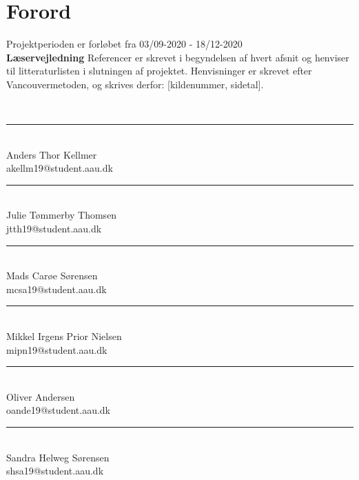 \section*{Forord}


Projektperioden er forløbet fra 03/09-2020 - 18/12-2020\\

\large\textbf{Læservejledning} \normalsize \newline
Referencer er skrevet i begyndelsen af hvert afsnit og henviser til litteraturlisten i slutningen af projektet. Henvisninger er skrevet efter Vancouvermetoden, og skrives derfor: [kildenummer, sidetal].
\bigskip

\textcolor{white}{tekst}

\begin{minipage}[L]{0.45\textwidth}
 \centering
 \rule{\textwidth}{0.5pt}\\
  Anders Thor Kellmer\\
 {\footnotesize akellm19@student.aau.dk}
\end{minipage}
\hfill
\begin{minipage}[H]{0.45\textwidth}
 \centering
 \rule{\textwidth}{0.5pt}\\
  Julie Tømmerby Thomsen\\
 {\footnotesize jtth19@student.aau.dk}
\end{minipage}
\vspace{3\baselineskip}


\begin{minipage}[L]{0.45\textwidth}
 \centering
 \rule{\textwidth}{0.5pt}\\
  Mads Carøe Sørensen\\
 {\footnotesize mcsa19@student.aau.dk}
\end{minipage}
\hfill
\begin{minipage}[H]{0.45\textwidth}
 \centering
 \rule{\textwidth}{0.5pt}\\
  Mikkel Irgens Prior Nielsen\\
 {\footnotesize mipn19@student.aau.dk}
\end{minipage}
\vspace{3\baselineskip}


\begin{minipage}[H]{0.45\textwidth}
 \centering
 \rule{\textwidth}{0.5pt}\\
 Oliver Andersen\\
 {\footnotesize oande19@student.aau.dk}
\end{minipage}
\hfill
\begin{minipage}[L]{0.45\textwidth}
 \centering
 \rule{\textwidth}{0.5pt}\\
 Sandra Helweg Sørensen\\
 {\footnotesize shsa19@student.aau.dk}
\end{minipage}

